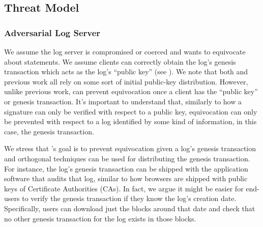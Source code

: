 \subsection{Threat Model}
\label{sec:catena:threat-model}

\subsubsection{Adversarial Log Server}
\label{sec:model:threat:log-server}
We assume the \Sys log server is compromised or coerced and wants to equivocate about statements.
We assume \Sys clients can correctly obtain the log's genesis transaction which acts as the log's ``public key'' (see ).
We note that both \Sys and previous work\cite{ct,ect,coniks,aki,arpki,cosi} all rely on some sort of initial public-key distribution.
However, unlike previous work, \Sys can prevent equivocation once a client has the ``public key'' or genesis transaction.
It's important to understand that, similarly to how a signature can only be verified with respect to a public key, equivocation can only be prevented with respect to a log identified by some kind of information, in this case, the genesis transaction.

We stress that \Sys's goal is to prevent equivocation given a log's genesis transaction and orthogonal techniques can be used for distributing the genesis transaction.
For instance, the log's genesis transaction can be shipped with the application software that audits that log, similar to how browsers are shipped with public keys of Certificate Authorities (CAs).
In fact, we argue it might be easier for end-users to verify the genesis transaction if they know the log's creation date.
Specifically, users can download just the blocks around that date and check that no other genesis transaction for the log exists in those blocks.

